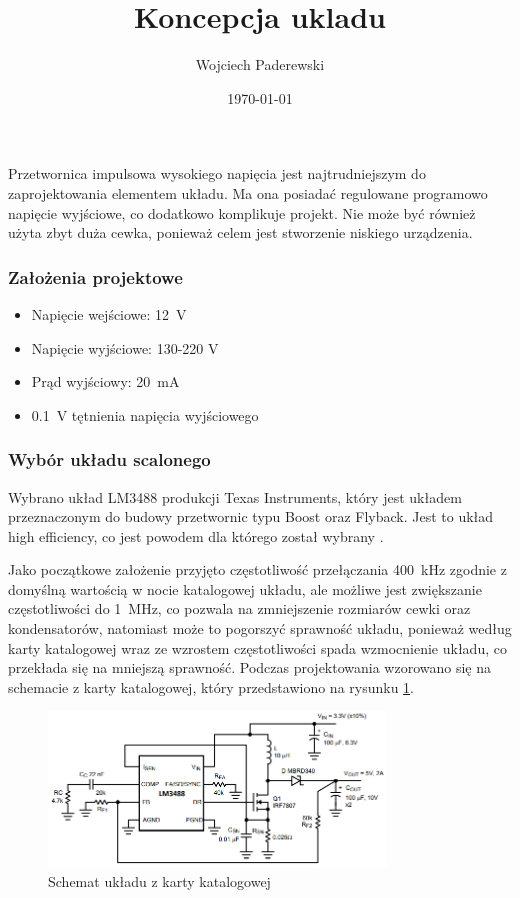 \documentclass[../../main.tex]{subfiles}
\author{Wojciech Paderewski}
\date{\today}
\title{Koncepcja ukladu}
\begin{document}
Przetwornica impulsowa wysokiego napięcia jest najtrudniejszym do zaprojektowania elementem układu.
Ma ona posiadać regulowane programowo napięcie wyjściowe, co dodatkowo komplikuje projekt.
Nie może być również użyta zbyt duża cewka, ponieważ celem jest stworzenie niskiego urządzenia.

\subsubsection{Założenia projektowe}
\begin{itemize}
    \item Napięcie wejściowe: \SI{12}{\volt}
    \item Napięcie wyjściowe: 130-220 V
    \item Prąd wyjściowy: \SI{20}{\milli\ampere}
    \item \SI{0.1}{\volt} tętnienia napięcia wyjściowego
\end{itemize}

\subsubsection{Wybór układu scalonego}
Wybrano układ LM3488 produkcji Texas Instruments, który jest układem przeznaczonym do budowy przetwornic typu Boost oraz Flyback. 
Jest to układ high efficiency, co jest powodem dla którego został wybrany \cite{st:lm3488}.

Jako początkowe założenie przyjęto częstotliwość przełączania \SI{400}{\kilo\hertz} zgodnie z domyślną wartością w nocie katalogowej układu, 
ale możliwe jest zwiększanie częstotliwości do \SI{1}{\mega\hertz}, co pozwala na zmniejszenie rozmiarów cewki oraz kondensatorów, natomiast może to
pogorszyć sprawność układu, ponieważ według karty katalogowej wraz ze wzrostem częstotliwości spada wzmocnienie układu, co przekłada się na mniejszą sprawność.
Podczas projektowania wzorowano się na schemacie z karty katalogowej, który przedstawiono na rysunku \ref{fig:boost}.

\begin{figure}[H]
    \centering
    \includegraphics[width=0.8\textwidth]{boost.png}
    \caption{Schemat układu z karty katalogowej \cite{st:lm3488}}
    \label{fig:boost}
\end{figure}
\end{document}
